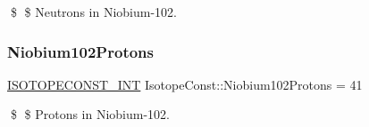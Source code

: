 \$ \$ Neutrons in Niobium-\/102. \mbox{\label{group___isotope_const-_niobium-_nb102_gaddd8841c094341ac67c6894ab869a0c3}} 
\subsubsection{\texorpdfstring{Niobium102\+Protons}{Niobium102Protons}}
{\footnotesize\ttfamily \mbox{\hyperlink{group___isotope_const-_macros_ga5f18360b3e99483a35c32d789e62621c}{I\+S\+O\+T\+O\+P\+E\+C\+O\+N\+S\+T\+\_\+\+I\+NT}} Isotope\+Const\+::\+Niobium102\+Protons = 41}

\$ \$ Protons in Niobium-\/102. 